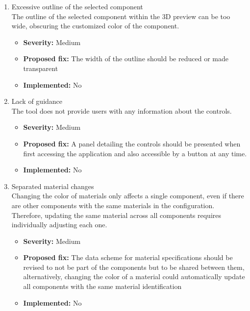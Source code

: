 \begin{enumerate}[label=\textbf{I\arabic*:}, leftmargin=*]
    \item Excessive outline of the selected component
        \vspace{2pt}
        \\The outline of the selected component within the 3D preview can be too wide, obscuring the customized color of the component.
        \begin{itemize}[noitemsep, label=\trianglebullet]
            \item \textbf{Severity:} Medium
            \item \textbf{Proposed fix:} The width of the outline should be reduced or made transparent
            \item \textbf{Implemented:} No
        \end{itemize}
        \vspace{4pt}

    \item Lack of guidance
        \vspace{2pt}
        \\The tool does not provide users with any information about the controls.
        \begin{itemize}[noitemsep, label=\trianglebullet]
            \item \textbf{Severity:} Medium
            \item \textbf{Proposed fix:} A panel detailing the controls should be presented when first accessing the application and also accessible by a button at any time.
            \item \textbf{Implemented:} No
        \end{itemize}
        \vspace{4pt}

    \item Separated material changes
        \vspace{2pt}
        \\Changing the color of materials only affects a single component, even if there are other components with the same materials in the configuration. Therefore, updating the same material across all components requires individually adjusting each one.
        \begin{itemize}[noitemsep, label=\trianglebullet]
            \item \textbf{Severity:} Medium
            \item \textbf{Proposed fix:} The data scheme for material specifications should be revised to not be part of the components but to be shared between them, alternatively, changing the color of a material could automatically update all components with the same material identification
            \item \textbf{Implemented:} No
        \end{itemize}
        \vspace{4pt}


\end{enumerate}
